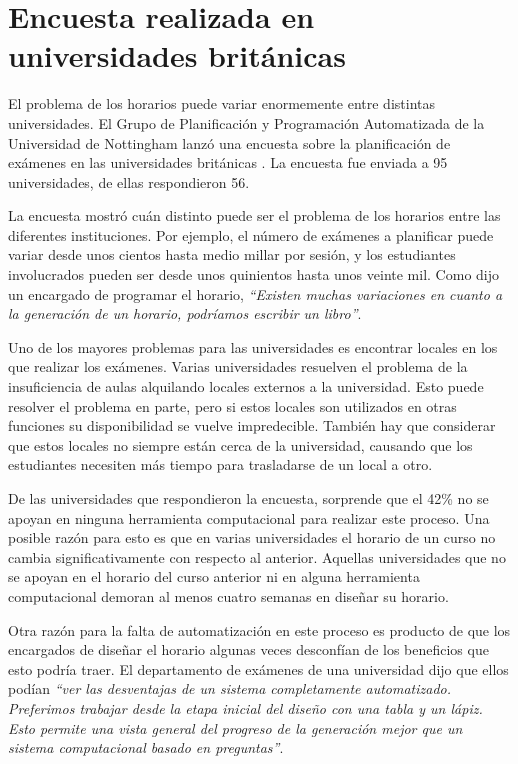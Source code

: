\section{Encuesta realizada en universidades británicas}

El problema de los horarios puede variar enormemente entre distintas universidades. El Grupo de Planificación
y Programación Automatizada de la Universidad de Nottingham lanzó una encuesta sobre la planificación de exámenes en las universidades británicas \cite{survey of University of Nottingham}. La encuesta fue enviada a 95 universidades, de ellas respondieron 56.

La encuesta mostró cuán distinto puede ser el problema de los horarios entre las diferentes instituciones.
Por ejemplo, el número de exámenes a planificar puede variar desde unos cientos hasta medio millar por sesión,
y los estudiantes involucrados pueden ser desde unos quinientos hasta unos veinte mil. Como dijo un
encargado de programar el horario, \emph{``Existen muchas variaciones en cuanto a la generación de un horario,
podr\'iamos escribir un libro''}.

Uno de los mayores problemas para las universidades es encontrar locales en los que realizar los exámenes.
Varias universidades resuelven el problema de la insuficiencia de aulas alquilando locales externos a la
universidad. Esto puede resolver el problema en parte, pero si estos locales son utilizados en otras funciones
su disponibilidad se vuelve impredecible. También hay que considerar que estos locales no siempre están cerca de
la universidad, causando que los estudiantes necesiten más tiempo para trasladarse de un local a otro.

De las universidades que respondieron la encuesta, sorprende que el 42\% no se apoyan en ninguna herramienta
computacional para realizar este proceso. Una posible razón para esto es que en varias universidades el
horario de un curso no cambia significativamente con respecto al anterior. Aquellas universidades que no
se apoyan en el horario del curso anterior ni en alguna herramienta computacional demoran al menos cuatro
semanas en diseñar su horario.

Otra razón para la falta de automatización en este proceso es producto de que los encargados de diseñar el horario
algunas veces desconf\'ian de los beneficios que esto podr\'ia traer. El departamento de exámenes de una universidad
dijo que ellos pod\'ian \emph{``ver las desventajas de un sistema completamente automatizado. Preferimos trabajar
desde la etapa inicial del diseño con una tabla y un l\'apiz. Esto permite una vista general del progreso de la
generación mejor que un sistema computacional basado en preguntas''}.

